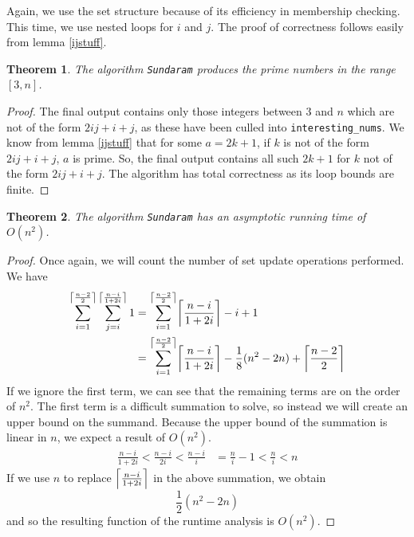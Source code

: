 \documentclass{amsart}
\DeclarePairedDelimiter{\ceil}{\lceil}{\rceil}
\newtheorem{thm}{Theorem}
\theoremstyle{definition}
\theoremstyle{case}
\begin{document}
	Again, we use the set structure because of its efficiency in membership checking. This time, we use nested loops for $i$ and $j$. The proof of correctness follows easily from lemma \ref{ijstuff}.
	
	\begin{thm}
		The algorithm \texttt{Sundaram} produces the prime numbers in the range $[3, n]$.
	\end{thm}
	\begin{proof}
		The final output contains only those integers between $3$ and $n$ which are not of the form $2ij+i+j$, as these have been culled into \texttt{interesting\_nums}. We know from lemma \ref{ijstuff} that for some $a=2k+1$, if $k$ is not of the form $2ij+i+j$, $a$ is prime. So, the final output contains all such $2k+1$ for $k$ not of the form $2ij+i+j$. The algorithm has total correctness as its loop bounds are finite.
	\end{proof}
	
	\begin{thm}
		The algorithm \texttt{Sundaram} has an asymptotic running time of $O(n^2)$.
	\end{thm}
	\begin{proof}
		Once again, we will count the number of set update operations performed. We have
		\begin{equation*}
		\begin{split}
		\sum_{i=1}^{\ceil*{\frac{n-2}{2}}} \sum_{j=i}^{\ceil*{\frac{n-i}{1+2i}}} 1 & = \sum_{i=1}^{\ceil*{\frac{n-2}{2}}} \ceil*{\frac{n-i}{1+2i}} - i + 1 \\
		& = \sum_{i=1}^{\ceil*{\frac{n-2}{2}}} \ceil*{\frac{n-i}{1+2i}} - \frac{1}{8}(n^2-2n) + \ceil*{\frac{n-2}{2}}
		\end{split}
		\end{equation*}
		If we ignore the first term, we can see that the remaining terms are on the order of $n^2$. The first term is a difficult summation to solve, so instead we will create an upper bound on the summand. Because the upper bound of the summation is linear in $n$, we expect a result of $O(n^2)$.
		\begin{equation*}
		\begin{split}
		\frac{n-i}{1+2i} < \frac{n-i}{2i} < \frac{n-i}{i} & = \frac{n}{i} - 1 < \frac{n}{i} < n
		\end{split}
		\end{equation*}
		If we use $n$ to replace $\ceil*{\frac{n-i}{1+2i}}$ in the above summation, we obtain
		$$\frac{1}{2}(n^2 - 2n)$$
		and so the resulting function of the runtime analysis is $O(n^2)$.
	\end{proof}
	
\end{document}
